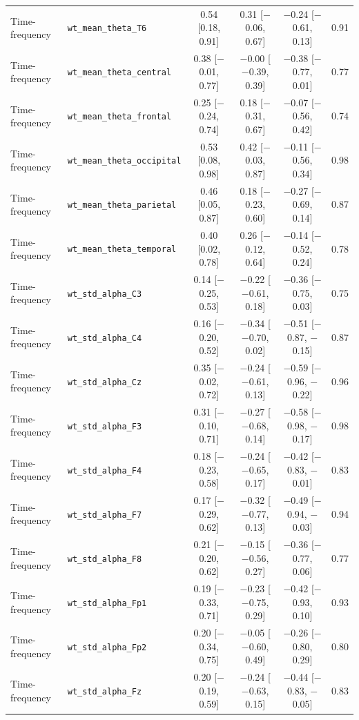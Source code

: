 {\begin{longtable}{llcccc}
Time-frequency & \texttt{wt\_mean\_theta\_T6} & 0.54 [0.18, 0.91] & 0.31 [$-$0.06, 0.67] & $-$0.24 [$-$0.61, 0.13] & 0.91 \\
Time-frequency & \texttt{wt\_mean\_theta\_central} & 0.38 [$-$0.01, 0.77] & $-$0.00 [$-$0.39, 0.39] & $-$0.38 [$-$0.77, 0.01] & 0.77 \\
Time-frequency & \texttt{wt\_mean\_theta\_frontal} & 0.25 [$-$0.24, 0.74] & 0.18 [$-$0.31, 0.67] & $-$0.07 [$-$0.56, 0.42] & 0.74 \\
Time-frequency & \texttt{wt\_mean\_theta\_occipital} & 0.53 [0.08, 0.98] & 0.42 [$-$0.03, 0.87] & $-$0.11 [$-$0.56, 0.34] & 0.98 \\
Time-frequency & \texttt{wt\_mean\_theta\_parietal} & 0.46 [0.05, 0.87] & 0.18 [$-$0.23, 0.60] & $-$0.27 [$-$0.69, 0.14] & 0.87 \\
Time-frequency & \texttt{wt\_mean\_theta\_temporal} & 0.40 [0.02, 0.78] & 0.26 [$-$0.12, 0.64] & $-$0.14 [$-$0.52, 0.24] & 0.78 \\
Time-frequency & \texttt{wt\_std\_alpha\_C3} & 0.14 [$-$0.25, 0.53] & $-$0.22 [$-$0.61, 0.18] & $-$0.36 [$-$0.75, 0.03] & 0.75 \\
Time-frequency & \texttt{wt\_std\_alpha\_C4} & 0.16 [$-$0.20, 0.52] & $-$0.34 [$-$0.70, 0.02] & $-$0.51 [$-$0.87, $-$0.15] & 0.87 \\
Time-frequency & \texttt{wt\_std\_alpha\_Cz} & 0.35 [$-$0.02, 0.72] & $-$0.24 [$-$0.61, 0.13] & $-$0.59 [$-$0.96, $-$0.22] & 0.96 \\
Time-frequency & \texttt{wt\_std\_alpha\_F3} & 0.31 [$-$0.10, 0.71] & $-$0.27 [$-$0.68, 0.14] & $-$0.58 [$-$0.98, $-$0.17] & 0.98 \\
Time-frequency & \texttt{wt\_std\_alpha\_F4} & 0.18 [$-$0.23, 0.58] & $-$0.24 [$-$0.65, 0.17] & $-$0.42 [$-$0.83, $-$0.01] & 0.83 \\
Time-frequency & \texttt{wt\_std\_alpha\_F7} & 0.17 [$-$0.29, 0.62] & $-$0.32 [$-$0.77, 0.13] & $-$0.49 [$-$0.94, $-$0.03] & 0.94 \\
Time-frequency & \texttt{wt\_std\_alpha\_F8} & 0.21 [$-$0.20, 0.62] & $-$0.15 [$-$0.56, 0.27] & $-$0.36 [$-$0.77, 0.06] & 0.77 \\
Time-frequency & \texttt{wt\_std\_alpha\_Fp1} & 0.19 [$-$0.33, 0.71] & $-$0.23 [$-$0.75, 0.29] & $-$0.42 [$-$0.93, 0.10] & 0.93 \\
Time-frequency & \texttt{wt\_std\_alpha\_Fp2} & 0.20 [$-$0.34, 0.75] & $-$0.05 [$-$0.60, 0.49] & $-$0.26 [$-$0.80, 0.29] & 0.80 \\
Time-frequency & \texttt{wt\_std\_alpha\_Fz} & 0.20 [$-$0.19, 0.59] & $-$0.24 [$-$0.63, 0.15] & $-$0.44 [$-$0.83, $-$0.05] & 0.83 \\

\end{longtable}}
